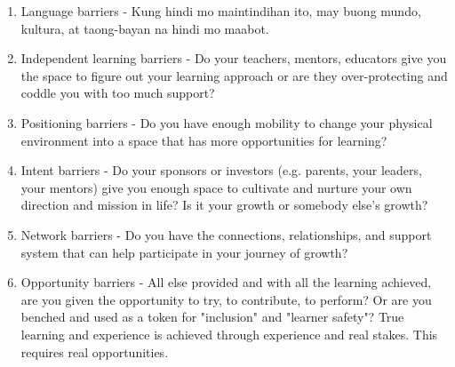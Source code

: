 \documentclass[journal, onecolumn]{IEEEtran}
\begin{document}
\begin{enumerate}
  A variation of informational barriers is personalization costs: There is a wide variety of options and modes 
  of teaching/learning available online. Some categorize the modes of learning as:
  visual, auditory, kinesthetic \footnote{citation needed}. These learning 
  preferences are not mutually exclusive (i.e. you only learn effectively in one
  form). It is more likely that a person has a mixed preference of the different
  learning modalities. Aside from the categorical preference in mod of teaching, 
  there are also other aspects of learning such as frequency of learning (e.g. Does 
  the student prefer visual learning very rarely but auditory learning very frequently?),
  transition speed (e.g. how quickly do we transition from one mode to the other), and 
  transition style (e.g. what's the effective way for these modalities to transition, 
  based on the student's preference in learning?). 
  When receiving educational material that does not match your preference in any 
  of these aspects, significant friction can occur that prevents a learner from 
  advancing and can trigger feelings of being overwhelmed and intimidated. 
  \item Language barriers - Kung hindi mo maintindihan ito, may buong mundo, kultura, at taong-bayan na hindi mo maabot.
  \item Independent learning barriers - Do your teachers, mentors, educators give you the space to figure out your learning approach or are they over-protecting and coddle you with too much support?
  \item Positioning barriers - Do you have enough mobility to change your physical environment into a space that has more opportunities for learning?
  \item Intent barriers - Do your sponsors or investors (e.g. parents, your leaders, your mentors) give you enough space to cultivate and nurture your own direction and mission in life? Is it your growth or somebody else's growth?
  \item Network barriers - Do you have the connections, relationships, and support system that can help participate in your journey of growth?
  \item Opportunity barriers - All else provided and with all the learning achieved, are you given the opportunity to try, to contribute, to perform? Or are you benched and used as a token for "inclusion" and "learner safety"? True learning and experience is achieved through experience and real stakes. This requires real opportunities.
\end{enumerate}
\end{document}
